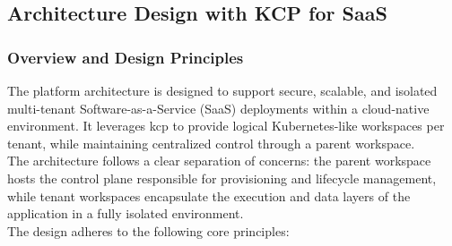 \documentclass[11pt, a4paper, oneside, listof=totoc]{scrartcl}
\begin{document}
                \cleardoublepage

        \subsection{Architecture Design with KCP for SaaS}\label{subsec:architectureDesign}
            
            \subsubsection{Overview and Design Principles}\label{subsubsec:architectureOverview}
                The platform architecture is designed to support secure, scalable, and isolated
                multi-tenant Software-as-a-Service (SaaS) deployments within a cloud-native
                environment.
                It leverages \gls{kcp} to provide logical Kubernetes-like workspaces per tenant,
                while maintaining centralized control through a parent workspace.
                \\
                The architecture follows a clear separation of concerns: the parent workspace hosts
                the control plane responsible for provisioning and lifecycle management, while
                tenant workspaces encapsulate the execution and data layers of the application in a
                fully isolated environment.
                \\
                The design adheres to the following core principles:
\end{document}
